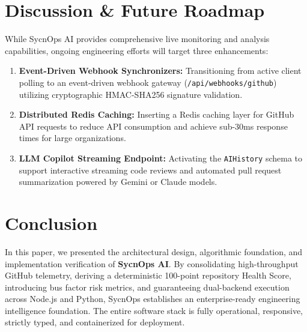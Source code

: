 \documentclass[conference]{IEEEtran}
\begin{document}
\section{Discussion \& Future Roadmap}
While SycnOps AI provides comprehensive live monitoring and analysis capabilities, ongoing engineering efforts will target three enhancements:
\begin{enumerate}
    \item \textbf{Event-Driven Webhook Synchronizers:} Transitioning from active client polling to an event-driven webhook gateway (\texttt{/api/webhooks/github}) utilizing cryptographic HMAC-SHA256 signature validation.
    \item \textbf{Distributed Redis Caching:} Inserting a Redis caching layer for GitHub API requests to reduce API consumption and achieve sub-30ms response times for large organizations.
    \item \textbf{LLM Copilot Streaming Endpoint:} Activating the \texttt{AIHistory} schema to support interactive streaming code reviews and automated pull request summarization powered by Gemini or Claude models.
\end{enumerate}

\section{Conclusion}
In this paper, we presented the architectural design, algorithmic foundation, and implementation verification of \textbf{SycnOps AI}. By consolidating high-throughput GitHub telemetry, deriving a deterministic 100-point repository Health Score, introducing bus factor risk metrics, and guaranteeing dual-backend execution across Node.js and Python, SycnOps establishes an enterprise-ready engineering intelligence foundation. The entire software stack is fully operational, responsive, strictly typed, and containerized for deployment.
\end{document}
